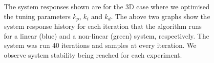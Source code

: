 \documentclass[conference]{IEEEtran}
\theoremstyle{definition}
\begin{document}
\begin{figure}[h]
    \caption{The system responses shown are for the 3D case where we optimised the tuning parameters $k_p$, $k_i$ and $k_d$. The above two graphs show the system response history for each iteration that the algorithm runs for a linear (blue) and a non-linear (green) system, respectively. The system was run 40 iterations and samples at every  iteration. We observe system stability being reached for each experiment.}
    \label{kpkikd}
\end{figure}

\begin{figure}[h]
    \caption{\lipsum[2]}
    \label{3D_plots}
\end{figure}

\begin{figure}[h]
    \caption{\lipsum[2]}
    \label{mimo_smooth}
\end{figure}

\begin{figure}[h]
    \caption{\lipsum[2]}
    \label{mimo_rough}
\end{figure}
\end{document}
